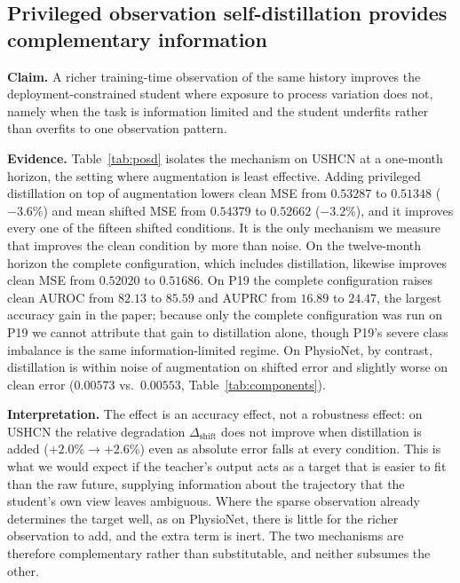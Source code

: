 
\subsection{Privileged observation self-distillation provides complementary information}
\label{sec:q-posd}

\textbf{Claim.} A richer training-time observation of the same history improves the deployment-constrained student
where exposure to process variation does not, namely when the task is information limited and the student underfits
rather than overfits to one observation pattern.

\textbf{Evidence.} Table~\ref{tab:posd} isolates the mechanism on USHCN at a one-month horizon, the setting where
augmentation is least effective. Adding privileged distillation on top of augmentation lowers clean MSE from
$0.53287$ to $0.51348$ ($-3.6\%$) and mean shifted MSE from $0.54379$ to $0.52662$ ($-3.2\%$), and it improves
every one of the fifteen shifted conditions. It is the only mechanism we measure that improves the clean condition
by more than noise. On the twelve-month horizon the complete configuration, which includes distillation, likewise
improves clean MSE from $0.52020$ to $0.51686$. On P19 the complete configuration raises clean AUROC from $82.13$
to $85.59$ and AUPRC from $16.89$ to $24.47$, the largest accuracy gain in the paper; because only the complete
configuration was run on P19 we cannot attribute that gain to distillation alone, though P19's severe class
imbalance is the same information-limited regime. On PhysioNet, by contrast, distillation is within noise of
augmentation on shifted error and slightly worse on clean error
($0.00573$ vs.\ $0.00553$, Table~\ref{tab:components}).

\textbf{Interpretation.} The effect is an accuracy effect, not a robustness effect: on USHCN the relative
degradation $\Delta_{\mathrm{shift}}$ does not improve when distillation is added ($+2.0\%\rightarrow+2.6\%$) even
as absolute error falls at every condition. This is what we would expect if the teacher's output acts as a target
that is easier to fit than the raw future, supplying information about the trajectory that the student's own view
leaves ambiguous. Where the sparse observation already determines the target well, as on PhysioNet, there is
little for the richer observation to add, and the extra term is inert. The two mechanisms are therefore
complementary rather than substitutable, and neither subsumes the other.

